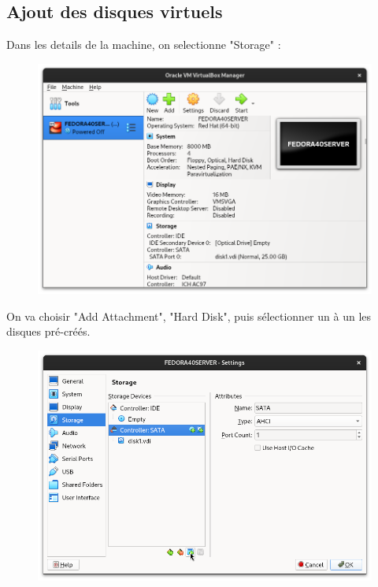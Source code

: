 \documentclass{article}
\begin{document}
\subsection{Ajout des disques virtuels}

Dans les details de la machine, on selectionne "Storage" :

\begin{figure}[h!]
		\centering
		\includegraphics[width=1\textwidth]{vbox20.png}
\end{figure}


\pagebreak

On va choisir "Add Attachment", "Hard Disk", puis sélectionner un à un les disques pré-créés.

\begin{figure}[h!]
		\centering
		\includegraphics[width=1\textwidth]{vbox21.png}
\end{figure}
\end{document}
